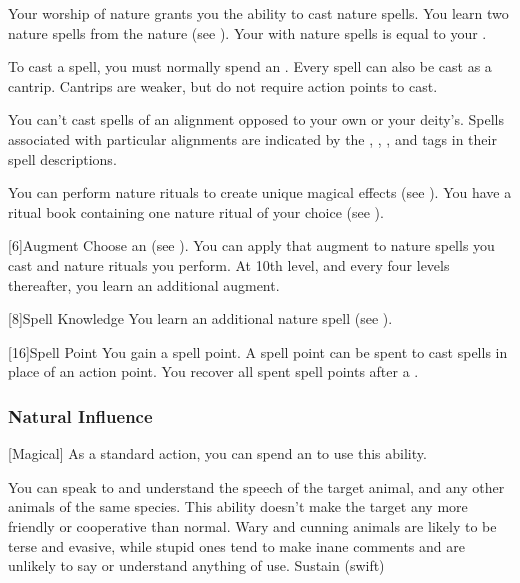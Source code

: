             Your worship of nature grants you the ability to cast nature spells.
            You learn two nature spells from the nature  (see ).
            Your  with nature spells is equal to your .

            To cast a spell, you must normally spend an .
            Every spell can also be cast as a cantrip.
            Cantrips are weaker, but do not require action points to cast.

            You can't cast spells of an alignment opposed to your own or your deity's.
            Spells associated with particular alignments are indicated by the , , , and  tags in their spell descriptions.

            You can perform nature rituals to create unique magical effects (see ).
            You have a ritual book containing one nature ritual of your choice (see ).

            [6]{Augment}
            Choose an  (see ).
            You can apply that augment to nature spells you cast and nature rituals you perform.
            At 10th level, and every four levels thereafter, you learn an additional augment.

            [8]{Spell Knowledge}
            You learn an additional nature spell (see ).

            [16]{Spell Point} 
            You gain a spell point.
            A spell point can be spent to cast spells in place of an action point.
            You recover all spent spell points after a .

        \subsubsection{Natural Influence}

            [Magical] As a standard action, you can spend an  to use this ability.
            \begin{ability}
                \begin{spelltargetinginfo}
                \end{spelltargetinginfo}
                \begin{spelleffects}
                    \spelleffect You can speak to and understand the speech of the target animal, and any other animals of the same species.
                    This ability doesn't make the target any more friendly or cooperative than normal.
                    Wary and cunning animals are likely to be terse and evasive, while stupid ones tend to make inane comments and are unlikely to say or understand anything of use.
                    \spelldur Sustain (swift)
                \end{spelleffects}
            \end{ability}

